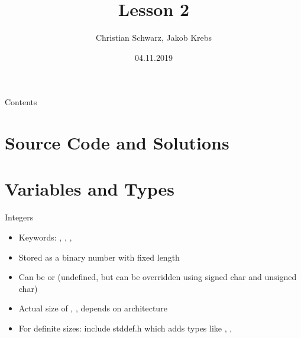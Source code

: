 \documentclass[10pt,graphics,aspectratio=169,table]{beamer}
\title{Lesson 2}
\author{Christian Schwarz, Jakob Krebs}
\date{04.11.2019}
\begin{document}
\maketitle

\begin{frame}{Contents}
    \tableofcontents
\end{frame}


\section{Source Code and Solutions}

\section{Variables and Types}
\begin{frame}{Integers}
    \begin{itemize}
        \item Keywords: , , , 
        \item Stored as a binary number with fixed length
        \item Can be  or  (undefined, but can be overridden using signed char and unsigned char)
        \item Actual size of , ,  depends on architecture
        \item For definite sizes: include stddef.h which adds types like , , 
    \end{itemize}
\end{frame}
\end{document}
